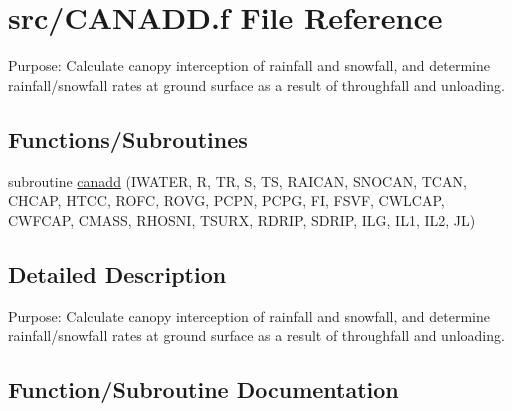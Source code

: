 \hypertarget{CANADD_8f}{}\section{src/\+C\+A\+N\+A\+D\+D.f File Reference}
\label{CANADD_8f}


Purpose\+: Calculate canopy interception of rainfall and snowfall, and determine rainfall/snowfall rates at ground surface as a result of throughfall and unloading.  


\subsection*{Functions/\+Subroutines}
\begin{DoxyCompactItemize}
\item 
subroutine \hyperlink{CANADD_8f_ae4481b561c2022da57ec7a4dacf6a9df}{canadd} (I\+W\+A\+T\+E\+R, R, T\+R, S, T\+S, R\+A\+I\+C\+A\+N, S\+N\+O\+C\+A\+N, T\+C\+A\+N, C\+H\+C\+A\+P, H\+T\+C\+C, R\+O\+F\+C, R\+O\+V\+G, P\+C\+P\+N, P\+C\+P\+G, F\+I, F\+S\+V\+F, C\+W\+L\+C\+A\+P, C\+W\+F\+C\+A\+P, C\+M\+A\+S\+S, R\+H\+O\+S\+N\+I, T\+S\+U\+R\+X, R\+D\+R\+I\+P, S\+D\+R\+I\+P, I\+L\+G, I\+L1, I\+L2, J\+L)
\end{DoxyCompactItemize}


\subsection{Detailed Description}
Purpose\+: Calculate canopy interception of rainfall and snowfall, and determine rainfall/snowfall rates at ground surface as a result of throughfall and unloading. 



\subsection{Function/\+Subroutine Documentation}
\hypertarget{CANADD_8f_ae4481b561c2022da57ec7a4dacf6a9df}{}
